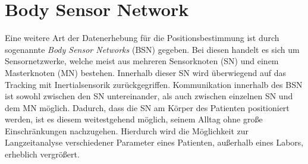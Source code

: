 \section{Body Sensor Network}
Eine weitere Art der Datenerhebung für die Positionsbestimmung ist durch sogenannte \textit{Body Sensor Networks} (BSN) gegeben.
Bei diesen handelt es sich um Sensornetzwerke, welche meist aus mehreren Sensorknoten (SN) und einem Masterknoten (MN) bestehen.
Innerhalb dieser SN wird überwiegend auf das Tracking mit Inertialsensorik zurückgegriffen.
Kommunikation innerhalb des BSN ist sowohl zwischen den SN untereinander, als auch zwischen einzelnen SN und dem MN möglich.
Dadurch, dass die SN am Körper des Patienten positioniert werden, ist es diesem weitestgehend möglich, seinem Alltag ohne große Einschränkungen nachzugehen.
Hierdurch wird die Möglichkeit zur Langzeitanalyse verschiedener Parameter eines Patienten, außerhalb eines Labors, erheblich vergrößert.
